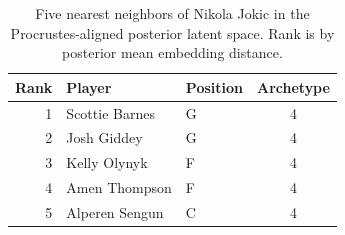 \begin{table}[htbp]
  \centering\small
  \begin{tabular}{rllc}
    \toprule
    Rank & Player & Position & Archetype \\
    \midrule
    1 & Scottie Barnes & G & 4 \\
    2 & Josh Giddey & G & 4 \\
    3 & Kelly Olynyk & F & 4 \\
    4 & Amen Thompson & F & 4 \\
    5 & Alperen Sengun & C & 4 \\
    \bottomrule
  \end{tabular}
  \caption{Five nearest neighbors of Nikola Jokic in the Procrustes-aligned posterior latent space. Rank is by posterior mean embedding distance.}
  \label{tab:Nikola_Jokic_neighbors}
\end{table}

